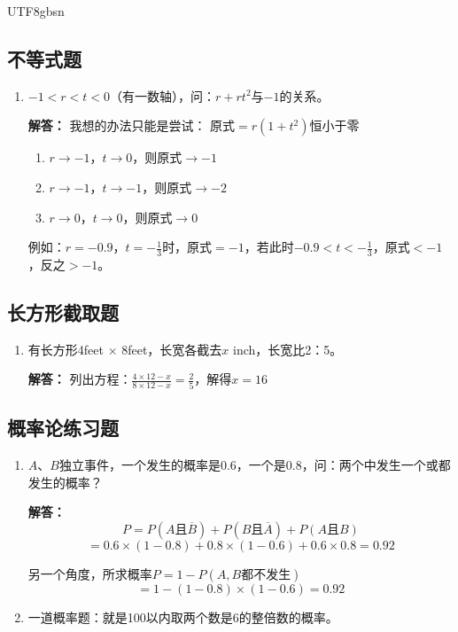 \documentclass[12pt]{article}
\begin{document}
\begin{CJK*}{UTF8}{gbsn}
\subsection{不等式题}
\begin{enumerate}
    \item $-1 < r < t < 0$（有一数轴），问：$r + rt^2$与$-1$的关系。
    
    \textbf{解答：} 我想的办法只能是尝试：
    原式$= r(1 + t^2)$恒小于零
    \begin{enumerate}
        \item $r \rightarrow -1$，$t \rightarrow 0$，则原式$\rightarrow -1$
        \item $r \rightarrow -1$，$t \rightarrow -1$，则原式$\rightarrow -2$
        \item $r \rightarrow 0$，$t \rightarrow 0$，则原式$\rightarrow 0$
    \end{enumerate}
    例如：$r = -0.9$，$t = -\frac{1}{3}$时，原式$= -1$，若此时$-0.9 < t < -\frac{1}{3}$，原式$< -1$，反之$> -1$。
\end{enumerate}

\subsection{长方形截取题}
\begin{enumerate}
    \item 有长方形4feet $\times$ 8feet，长宽各截去$x$ inch，长宽比2：5。
    
    \textbf{解答：} 列出方程：$\frac{4 \times 12 - x}{8 \times 12 - x} = \frac{2}{5}$，解得$x = 16$
\end{enumerate}

\subsection{概率论练习题}
\begin{enumerate}
    \item $A$、$B$独立事件，一个发生的概率是0.6，一个是0.8，问：两个中发生一个或都发生的概率？
    
    \textbf{解答：}
    $$P = P(A \text{且} \overline{B}) + P(B \text{且} \overline{A}) + P(A \text{且} B)$$
    $$= 0.6 \times (1-0.8) + 0.8 \times (1-0.6) + 0.6 \times 0.8 = 0.92$$
    
    另一个角度，所求概率$P = 1 - P(A,B \text{都不发生})$
    $$= 1 - (1-0.8) \times (1-0.6) = 0.92$$
    
    \item 一道概率题：就是100以内取两个数是6的整倍数的概率。
    

\end{enumerate}
\end{CJK*}
\end{document}
